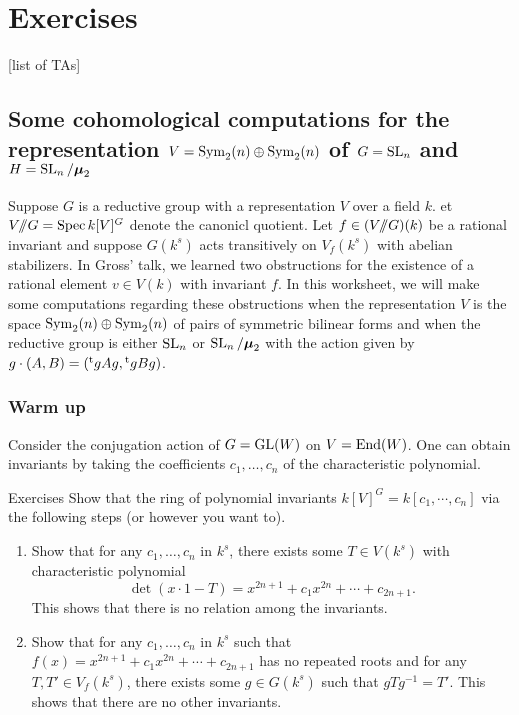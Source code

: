 
\section{Exercises}





[list of TAs]





\subsection{Some cohomological computations for the representation \texorpdfstring{$V=\operatorname{Sym}_2(n)\oplus \operatorname{Sym}_2(n)$}{V=Sym2(n)+Sym2(n)} of \texorpdfstring{$G=\operatorname{SL}_n$}{G=SLn} and \texorpdfstring{$H=\operatorname{SL}_n/\boldsymbol\mu_2$}{H=SL2/mu2}}

Suppose $G$ is a reductive group with a representation $V$ over a field $k$. 
et $V/\!\!/ G=\operatorname{Spec} k[V]^G$ denote the canonicl quotient. Let 
$f\in (V/\!\!/ G)(k)$ be a rational invariant and suppose $G(k^s)$ acts 
transitively on $V_f(k^s)$ with abelian stabilizers. In Gross' talk, we 
learned two obstructions for the existence of a rational element $v\in V(k)$ 
with invariant $f$. In this worksheet, we will make some computations regarding 
these obstructions when the representation $V$ is the space 
$\operatorname{Sym}_2(n)\oplus\operatorname{Sym}_2(n)$ of pairs of symmetric bilinear forms and 
when the reductive group is either $\operatorname{SL}_n$ or 
$\operatorname{SL}_n/\boldsymbol\mu_2$ with the action given by 
$g\cdot (A,B)=(\prescript{\mathrm{t}}{}{g} A g, \prescript{\mathrm{t}}{}{g} B g)$. 


\subsubsection{Warm up}

Consider the conjugation action of $G=\operatorname{GL}(W)$ on $V=\operatorname{End}(W)$. One 
can obtain invariants by taking the coefficients $c_1,\dots,c_n$ of the 
characteristic polynomial. 

\begin{enonce*}[remark]{Exercises}
Show that the ring of polynomial invariants $k[V]^G=k[c_1,\cdots,c_n]$ via the 
following steps (or however you want to). 
\begin{enumerate}
  \item Show that for any $c_1,\dots,c_n$ in $k^s$, there exists some 
    $T\in V(k^s)$ with characteristic polynomial 
    \[
      \det(x\cdot 1-T) = x^{2n+1} + c_1 x^{2n} + \cdots + c_{2n+1} .
    \]
    This shows that there is no relation among the invariants. 
  \item Show that for any $c_1,\dots,c_n$ in $k^s$ such that 
    $f(x)=x^{2n+1} + c_1 x^{2n} + \cdots + c_{2n+1}$ has no repeated roots and 
    for any $T,T'\in V_f(k^s)$, there exists some $g\in G(k^s)$ such that 
    $g T g^{-1} = T'$. This shows that there are no other invariants. 
\end{enumerate}
\end{enonce*}

